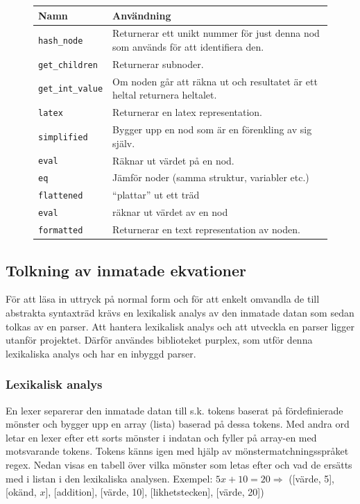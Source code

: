 \documentclass[12pt,a4paper]{article}
\begin{document}
\begin{figure}[h!]
  \centering
  \begin{tabular}{l|p{10cm}}
    \textbf{Namn} & \textbf{Användning} \\
    \hline
    \texttt{hash\_node} & Returnerar ett unikt nummer för just denna nod som används för att identifiera den. \\
    \texttt{get\_children} & Returnerar subnoder. \\
    \texttt{get\_int\_value} & Om noden går att räkna ut och resultatet är ett heltal returnera heltalet. \\
    \texttt{latex} & Returnerar en latex representation. \\
    \texttt{simplified} & Bygger upp en nod som är en förenkling av sig själv. \\
    \texttt{eval} & Räknar ut värdet på en nod. \\
    \texttt{eq} & Jämför noder (samma struktur, variabler etc.) \\
    \texttt{flattened} & ``plattar'' ut ett träd \\
    \texttt{eval} & räknar ut värdet av en nod \\
    \texttt{formatted} & Returnerar en text representation av noden.
  \end{tabular}
   \label{tab:basenodefunc}
\end{figure}

\subsection{Tolkning av inmatade ekvationer}
För att läsa in uttryck på normal form och för att enkelt omvandla de till abstrakta syntaxträd krävs en lexikalisk analys av den inmatade datan som sedan tolkas av en parser. Att hantera lexikalisk analys och att utveckla en parser ligger utanför projektet. Därför användes biblioteket purplex, som utför denna lexikaliska analys och har en inbyggd parser.

\subsubsection{Lexikalisk analys}
\label{subsubsec:lexikaliskanal}
En lexer separerar den inmatade datan till s.k. tokens baserat på fördefinierade mönster och bygger upp en array (lista) baserad på dessa tokens. Med andra ord letar en lexer efter ett sorts mönster i indatan och fyller på array-en med motsvarande tokens. Tokens känns igen med hjälp av mönstermatchningsspråket regex. Nedan visas en tabell över vilka mönster som letas efter och vad de ersätts med i listan i den lexikaliska analysen. 
Exempel: \(5x+10=20\Rightarrow\) ([värde, 5], [okänd, \(x\)], [addition], [värde, 10], [likhetstecken], [värde, 20])
\end{document}
